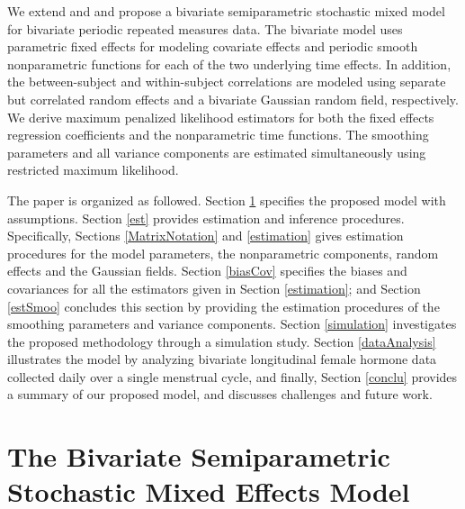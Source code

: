 \documentclass[12pt, notitlepage]{article}
\begin{document}
We extend \citet {Zhang:1998} and \citet{Zhan:Lin:Sowe:quan:2000} and propose a bivariate semiparametric stochastic mixed model for bivariate periodic repeated measures data.  The bivariate model uses parametric fixed effects for modeling covariate effects and periodic smooth nonparametric functions for each of the two underlying time effects. In addition, the between-subject and within-subject correlations are modeled using separate but correlated random effects and a bivariate Gaussian random field, respectively. We derive maximum penalized likelihood estimators for both the fixed effects regression coefficients and the nonparametric time functions. The smoothing parameters and all variance components are estimated simultaneously using restricted maximum likelihood.  


The paper is organized as followed. Section \ref{modelSpe} specifies the proposed model with assumptions. Section \ref{est} provides estimation and inference procedures. Specifically, Sections \ref{MatrixNotation} and \ref{estimation} gives estimation procedures for  the model parameters, the nonparametric components, random effects and the Gaussian fields.  
Section \ref{biasCov} specifies the biases and covariances for all the estimators given in Section \ref{estimation}; and Section \ref{estSmoo}  concludes this section by providing the estimation procedures of the smoothing parameters and variance components. 
Section \ref{simulation} investigates the proposed methodology through a simulation study.  
Section \ref{dataAnalysis}  illustrates the model by analyzing bivariate longitudinal female hormone data collected daily over a single menstrual cycle, and finally, Section \ref{conclu} provides a summary of our proposed model, and discusses challenges and future work.


%
%
%

\section{The Bivariate Semiparametric Stochastic Mixed Effects Model} \label{modelSpe}


\end{document}
